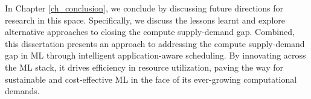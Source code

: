 In Chapter \ref{ch_conclusion}, we conclude by discussing future directions for research in this space. Specifically, we discuss the lessons learnt and explore alternative approaches to closing the compute supply-demand gap. Combined, this dissertation presents an approach to addressing the compute supply-demand gap in ML through intelligent application-aware scheduling. By innovating across the ML stack, it drives efficiency in resource utilization, paving the way for sustainable and cost-effective ML in the face of its ever-growing computational demands.






